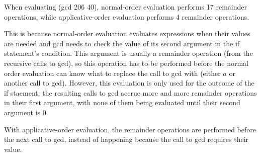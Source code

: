 \documentclass{minimal}
\begin{document}
{\begin{landscape}
When evaluating (gcd 206 40), normal-order evaluation performs 17 remainder
operations, while applicative-order evaluation performs 4 remainder operations.

This is because normal-order evaluation evaluates expressions when their values
are needed and gcd needs to check the value of its second argument in the if
statement's condition. This argument is usually a remainder operation (from the
recursive calls to gcd), so this operation has to be performed before the
normal order evaluation can know what to replace the call to gcd with (either
$a$ or another call to gcd). However, this evaluation is only used for the
outcome of the if staement: the resulting calls to gcd accrue more and more
remainder operations in their first argument, with none of them being evaluated
until their second argument is 0.

With applicative-order evaluation, the remainder operations are performed
before the next call to gcd, instead of happening because the call to gcd
requires their value.

\end{landscape}}
\end{document}
